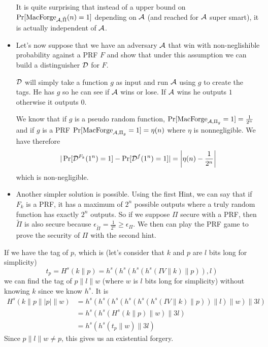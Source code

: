 \begin{solution}
\begin{itemize}
      It is quite surprising that instead of a upper bound
      on $\Pr[\operatorname{MacForge}_{\mathcal{A}, \tilde{\Pi}}(n) = 1]$
      depending on $\mathcal{A}$ (and reached for $\mathcal{A}$ super smart),
      it is actually independent of $\mathcal{A}$.
    \item
      Let's now suppose that we have an adversary $\mathcal{A}$
      that win with non-neglishible probability against a PRF $F$
      and show that under this assumption we can build
      a distinguisher $\mathcal{D}$ for $F$.

      $\mathcal{D}$ will simply take a function $g$ as input
      and run $\mathcal{A}$ using $g$ to create the tags.
      He has $g$ so he can see if $\mathcal{A}$ wins or lose.
      If $\mathcal{A}$ wins he outputs $1$ otherwise it outputs $0$.

      We know that if $g$ is a pseudo random function,
      $\Pr[\operatorname{MacForge}_{\mathcal{A}, \Pi_g} = 1] = \frac{1}{2^n}$
      and if $g$ is a PRF
      $\Pr[\operatorname{MacForge}_{\mathcal{A}, \Pi_g} = 1] = \eta(n)$
      where $\eta$ is nonnegligible.
      We have therefore
      \[
        |\Pr[\mathcal{D}^{F_k}(1^n) = 1] - \Pr[\mathcal{D}^{f}(1^n) = 1]|
        = \left|\eta(n) - \frac{1}{2^n}\right|
      \]
      which is non-negligible.

    \item
      Another simpler solution is possible. Using the first Hint, we can say that if $F_k$ is a PRF, it has a maximum of $2^n$ possible outputs 
      where a truly random function has exactly $2^n$ outputs. So if we suppose $\Pi$ secure with a PRF, then $\tilde{\Pi}$ is also secure because 
      $\epsilon_{\tilde{\Pi}}  = \frac{1}{2^n} \geq \epsilon_{\Pi}$. We then can play the PRF game to prove the security of $\Pi$ with the second hint.
  \end{itemize}

\end{solution}

\begin{solution}
  If we have the tag of $p$, which is (let's consider that $k$ and $p$ are $l$ bits long for simplicity)
  \[ t_p = H^s(k\|p) = h^s(h^s(h^s(h^s(IV \| k) \| p)), l) \]
  we can find the tag of $p\|l\|w$ (where $w$ is $l$ bits long for simplicity)
  without knowing $k$ since we know $h^s$.
  It is
  \begin{align*}
    H^s(k\|p\||p|\|w)
    & = h^s(h^s(h^s(h^s(h^s(h^s(IV \| k) \| p)) \| l) \| w) \| 3l)\\
    & = h^s(h^s(H^s(k \| p) \| w) \| 3l)\\
    & = h^s(h^s(t_p \| w) \| 3l)
  \end{align*}
  Since $p\|l\|w \neq p$, this gives us an existential forgery.
\end{solution}

